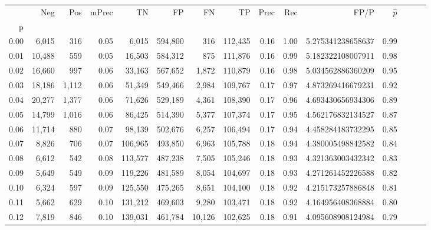 \begin{tabular}{rrrrrrrrrrrrrrr}
\toprule
{} &     Neg &    Pos & mPrec &       TN &       FP &       FN &       TP &  Prec &   Rec &                  FP/P & $\hat{p}$ \\
p    &         &        &       &          &          &          &          &       &       &                       &           \\
\midrule
0.00 &   6,015 &    316 &  0.05 &    6,015 &  594,800 &      316 &  112,435 &  0.16 &  1.00 &     5.275341238658637 &      0.99 \\
0.01 &  10,488 &    559 &  0.05 &   16,503 &  584,312 &      875 &  111,876 &  0.16 &  0.99 &     5.182322108007911 &      0.98 \\
0.02 &  16,660 &    997 &  0.06 &   33,163 &  567,652 &    1,872 &  110,879 &  0.16 &  0.98 &     5.034562886360209 &      0.95 \\
0.03 &  18,186 &  1,112 &  0.06 &   51,349 &  549,466 &    2,984 &  109,767 &  0.17 &  0.97 &     4.873269416679231 &      0.92 \\
0.04 &  20,277 &  1,377 &  0.06 &   71,626 &  529,189 &    4,361 &  108,390 &  0.17 &  0.96 &     4.693430656934306 &      0.89 \\
0.05 &  14,799 &  1,016 &  0.06 &   86,425 &  514,390 &    5,377 &  107,374 &  0.17 &  0.95 &     4.562176832134527 &      0.87 \\
0.06 &  11,714 &    880 &  0.07 &   98,139 &  502,676 &    6,257 &  106,494 &  0.17 &  0.94 &     4.458284183732295 &      0.85 \\
0.07 &   8,826 &    706 &  0.07 &  106,965 &  493,850 &    6,963 &  105,788 &  0.18 &  0.94 &     4.380005498842582 &      0.84 \\
0.08 &   6,612 &    542 &  0.08 &  113,577 &  487,238 &    7,505 &  105,246 &  0.18 &  0.93 &     4.321363003432342 &      0.83 \\
0.09 &   5,649 &    549 &  0.09 &  119,226 &  481,589 &    8,054 &  104,697 &  0.18 &  0.93 &     4.271261452226588 &      0.82 \\
0.10 &   6,324 &    597 &  0.09 &  125,550 &  475,265 &    8,651 &  104,100 &  0.18 &  0.92 &     4.215173257886848 &      0.81 \\
0.11 &   5,662 &    629 &  0.10 &  131,212 &  469,603 &    9,280 &  103,471 &  0.18 &  0.92 &     4.164956408368884 &      0.80 \\
0.12 &   7,819 &    846 &  0.10 &  139,031 &  461,784 &   10,126 &  102,625 &  0.18 &  0.91 &     4.095608908124984 &      0.79 \\

\end{tabular}
